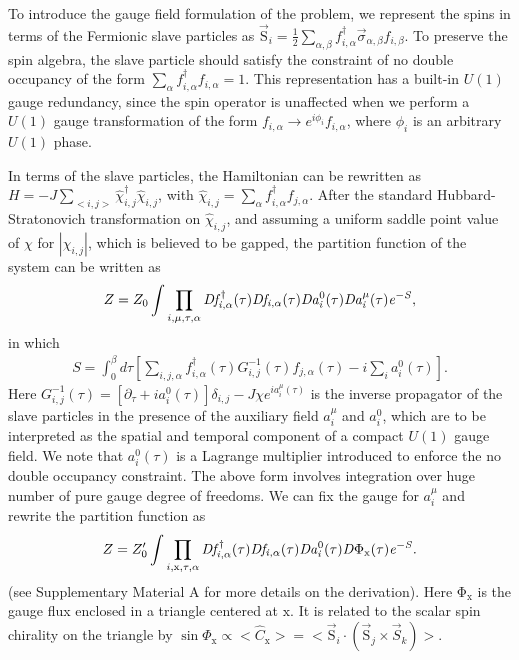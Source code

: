 \documentclass[12pt]{article}
\begin{document}
To introduce the gauge field formulation of the problem, we represent the spins in terms of the Fermionic slave particles as $\vec{\mathrm{S}}_{i}=\frac{1}{2}\sum_{\alpha,\beta}f^{\dagger}_{i,\alpha}\vec{\sigma}_{\alpha,\beta}f_{i,\beta}$. To preserve the spin algebra, the slave particle should satisfy the constraint of no double occupancy of the form $\sum_{\alpha} f^{\dagger}_{i,\alpha}f_{i,\alpha}=1$.  This representation has a built-in $U(1)$ gauge redundancy, since the spin operator is unaffected when we perform a $U(1)$ gauge transformation of the form $f_{i,\alpha}\rightarrow e^{i\phi_{i}}f_{i,\alpha}$, where $\phi_{i}$  is an arbitrary $U(1)$ phase. 

In terms of the slave particles, the Hamiltonian can be rewritten as $H=-J\sum_{<i,j>}\hat{\chi}_{i,j}^{\dagger}\hat{\chi}_{i,j}$, with $\hat{\chi}_{i,j}=\sum_{\alpha}f^{\dagger}_{i,\alpha}f_{j,\alpha}$.  After the standard Hubbard-Stratonovich transformation on $\hat{\chi}_{i,j}$,  and assuming a uniform saddle point value of $\chi$ for $|\chi_{i,j}|$, which is believed to be gapped, the partition function of the system can be written as
  \begin{eqnarray}
 Z= Z_{0} \int \prod_{i,\mu,\tau,\alpha} \it{D}f^{\dagger}_{i,\alpha}(\tau)\it{D}f_{i,\alpha}(\tau)\it{D}a^{\mathrm{0}}_{i}(\tau) \it{D}a^{\mu}_{i}(\tau) e^{-S},\nonumber
 \end{eqnarray}
 in which 
 \begin{eqnarray}
S=\int_{0}^{\beta} d\tau   [\sum_{i,j,\alpha}f^{\dagger}_{i,\alpha}(\tau)G^{-1}_{i,j}(\tau) f_{j,\alpha}(\tau)-i\sum_{i}a^{0}_{i}(\tau)] .\nonumber
 \end{eqnarray} 
Here $G^{-1}_{i,j}(\tau)=[\partial_{\tau}+ia^{0}_{i}(\tau)]\delta_{i,j}-J\chi e^{ia^{\mu}_{i}(\tau)}$ is the inverse propagator of the slave particles in the presence of the auxiliary field $a^{\mu}_{i}$ and $a^{0}_{i}$, which are to be interpreted as the spatial and temporal component of a compact $U(1)$ gauge field. We note that $a^{0}_{i}(\tau)$ is a Lagrange multiplier introduced to enforce the no double occupancy constraint.  
The above form involves integration over huge number of pure gauge degree of freedoms. We can fix the gauge for $a^{\mu}_{i}$ and rewrite the partition function as
 \begin{eqnarray}
 Z= Z'_{0} \int \prod_{i,\mathrm{x},\tau,\alpha} \it{D}f^{\dagger}_{i,\alpha}(\tau)\it{D}f_{i,\alpha}(\tau)\it{D}a^{\mathrm{0}}_{i}(\tau) \it{D}\mathrm{\Phi}_{\mathrm{x}}(\tau) e^{-S}.\nonumber
 \end{eqnarray}
(see Supplementary Material A for more details on the derivation). Here $\mathrm{\Phi}_{\mathrm{x}}$ is the gauge flux enclosed in a triangle centered at $\mathrm{x}$. It is related to the scalar spin chirality on the triangle by  $\sin \Phi_{\mathrm{x}} \propto  <\hat{C}_{\mathrm{x}}>=<\vec{\mathrm{S}}_{i}\cdot (\vec{\mathrm{S}}_{j} \times \vec{S}_{k})> $.
\end{document}
